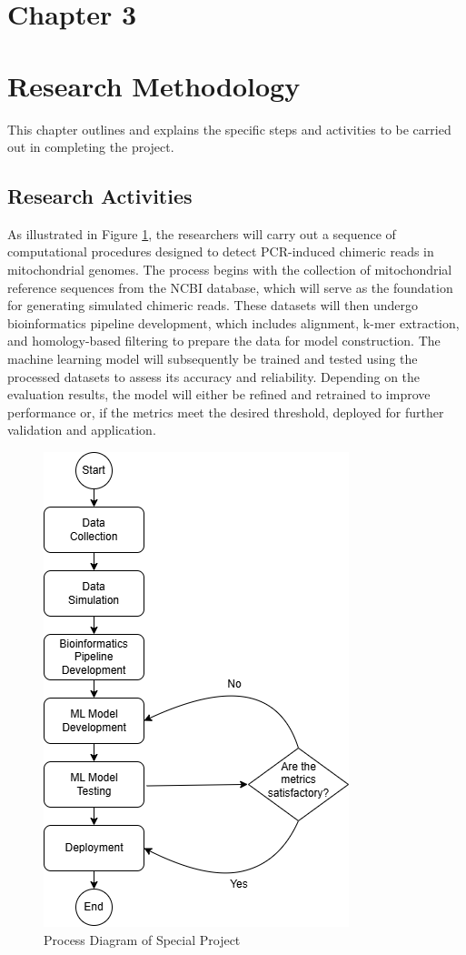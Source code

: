 \documentclass{article}
\begin{document}
\section*{Chapter 3}
\section{Research Methodology}
This chapter outlines and explains the specific steps and activities to be carried out in completing the project.

 \subsection{Research Activities}
 As illustrated in Figure \ref{fig:process_diagram}, the researchers will carry out a sequence of computational procedures designed to detect PCR-induced chimeric reads in mitochondrial genomes. The process begins with the collection of mitochondrial reference sequences from the NCBI database, which will serve as the foundation for generating simulated chimeric reads. These datasets will then undergo bioinformatics pipeline development, which includes alignment, k-mer extraction, and homology-based filtering to prepare the data for model construction. The machine learning model will subsequently be trained and tested using the processed datasets to assess its accuracy and reliability. Depending on the evaluation results, the model will either be refined and retrained to improve performance or, if the metrics meet the desired threshold, deployed for further validation and application.

\begin{figure}[H]
    \centering
    \includegraphics[width=0.4\linewidth]{figures/research_activities.png}
    \caption{Process Diagram of Special Project}
    \label{fig:process_diagram}  
\end{figure}
\end{document}
